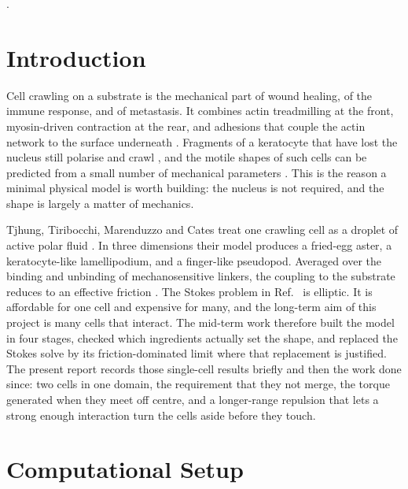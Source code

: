 \documentclass[11pt]{article}
\begin{document}
\newpage
\thispagestyle{empty}
.
\newpage
\clearpage
\setcounter{page}{1}
\section{Introduction}
\label{sec:intro}

\noindent
Cell crawling on a substrate is the mechanical part of wound healing, of the immune response, and of metastasis. It combines actin treadmilling at the front, myosin-driven contraction at the rear, and adhesions that couple the actin network to the surface underneath \cite{Bray:2000}. Fragments of a keratocyte that have lost the nucleus still polarise and crawl \cite{Verkhovsky:1999}, and the motile shapes of such cells can be predicted from a small number of mechanical parameters \cite{Keren:2008}. This is the reason a minimal physical model is worth building: the nucleus is not required, and the shape is largely a matter of mechanics.

Tjhung, Tiribocchi, Marenduzzo and Cates treat one crawling cell as a droplet of active polar fluid \cite{Tjhung:2015}. In three dimensions their model produces a fried-egg aster, a keratocyte-like lamellipodium, and a finger-like pseudopod. Averaged over the binding and unbinding of mechanosensitive linkers, the coupling to the substrate reduces to an effective friction \cite{Leoni:2017}. The Stokes problem in Ref.~\cite{Tjhung:2015} is elliptic. It is affordable for one cell and expensive for many, and the long-term aim of this project is many cells that interact. The mid-term work therefore built the model in four stages, checked which ingredients actually set the shape, and replaced the Stokes solve by its friction-dominated limit where that replacement is justified. The present report records those single-cell results briefly and then the work done since: two cells in one domain, the requirement that they not merge, the torque generated when they meet off centre, and a longer-range repulsion that lets a strong enough interaction turn the cells aside before they touch.

\section{Computational Setup}
\label{sec:model}
\end{document}
